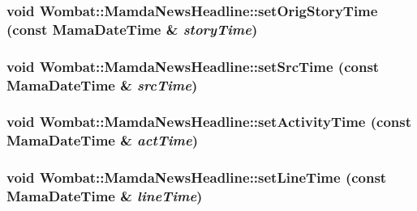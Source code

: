 \hypertarget{classWombat_1_1MamdaNewsHeadline_cebec0dac4b5b58dd8d537f41275f219}{
\subsubsection[setOrigStoryTime]{\setlength{\rightskip}{0pt plus 5cm}void Wombat::Mamda\-News\-Headline::set\-Orig\-Story\-Time (const Mama\-Date\-Time \& {\em story\-Time})}}
\label{classWombat_1_1MamdaNewsHeadline_cebec0dac4b5b58dd8d537f41275f219}


\hypertarget{classWombat_1_1MamdaNewsHeadline_46fdb313b07b31d6081caacb6c28b4c2}{
\subsubsection[setSrcTime]{\setlength{\rightskip}{0pt plus 5cm}void Wombat::Mamda\-News\-Headline::set\-Src\-Time (const Mama\-Date\-Time \& {\em src\-Time})}}
\label{classWombat_1_1MamdaNewsHeadline_46fdb313b07b31d6081caacb6c28b4c2}


\hypertarget{classWombat_1_1MamdaNewsHeadline_2d24225ae9828f208caa7f245ff29ee2}{
\subsubsection[setActivityTime]{\setlength{\rightskip}{0pt plus 5cm}void Wombat::Mamda\-News\-Headline::set\-Activity\-Time (const Mama\-Date\-Time \& {\em act\-Time})}}
\label{classWombat_1_1MamdaNewsHeadline_2d24225ae9828f208caa7f245ff29ee2}


\hypertarget{classWombat_1_1MamdaNewsHeadline_d1ee189e8ff1ef53fd7327fe7f8397d7}{
\subsubsection[setLineTime]{\setlength{\rightskip}{0pt plus 5cm}void Wombat::Mamda\-News\-Headline::set\-Line\-Time (const Mama\-Date\-Time \& {\em line\-Time})}}
\label{classWombat_1_1MamdaNewsHeadline_d1ee189e8ff1ef53fd7327fe7f8397d7}


